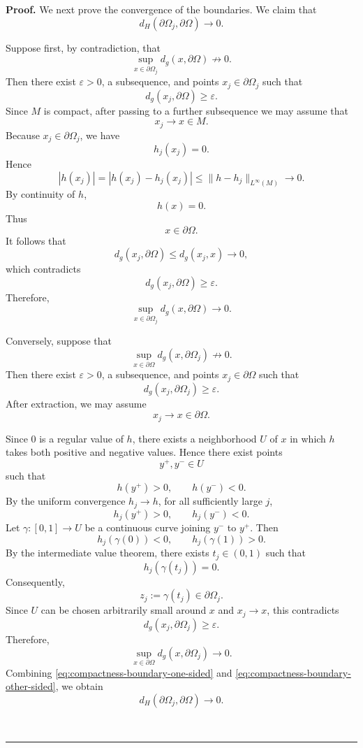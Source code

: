 \documentclass{article}
\newenvironment{proof}[1][Proof]{\textbf{#1.} }{\ \rule{0.5em}{0.5em}}
\begin{document}
\begin{proof}
We next prove the convergence of the boundaries. We claim that
\begin{equation}
d_H(\partial\Omega_j,\partial\Omega)
\longrightarrow0.
\label{eq:compactness-boundary-Hausdorff}
\end{equation}

Suppose first, by contradiction, that
\[
\sup_{x\in\partial\Omega_j}
d_g(x,\partial\Omega)
\not\longrightarrow0.
\]
Then there exist $\varepsilon>0$, a subsequence, and points
$x_j\in\partial\Omega_j$ such that
\[
d_g(x_j,\partial\Omega)\ge\varepsilon.
\]
Since $M$ is compact, after passing to a further subsequence we may
assume that
\[
x_j\longrightarrow x\in M.
\]
Because $x_j\in\partial\Omega_j$, we have
\[
h_j(x_j)=0.
\]
Hence
\[
|h(x_j)|
=
|h(x_j)-h_j(x_j)|
\le
\|h-h_j\|_{L^\infty(M)}
\longrightarrow0.
\]
By continuity of $h$,
\[
h(x)=0.
\]
Thus
\[
x\in\partial\Omega.
\]
It follows that
\[
d_g(x_j,\partial\Omega)
\le d_g(x_j,x)
\longrightarrow0,
\]
which contradicts
\[
d_g(x_j,\partial\Omega)\ge\varepsilon.
\]
Therefore,
\begin{equation}
\sup_{x\in\partial\Omega_j}
d_g(x,\partial\Omega)
\longrightarrow0.
\label{eq:compactness-boundary-one-sided}
\end{equation}

Conversely, suppose that
\[
\sup_{x\in\partial\Omega}
d_g(x,\partial\Omega_j)
\not\longrightarrow0.
\]
Then there exist $\varepsilon>0$, a subsequence, and points
$x_j\in\partial\Omega$ such that
\[
d_g(x_j,\partial\Omega_j)\ge\varepsilon.
\]
After extraction, we may assume
\[
x_j\longrightarrow x\in\partial\Omega.
\]

Since $0$ is a regular value of $h$, there exists a neighborhood $U$
of $x$ in which $h$ takes both positive and negative values. Hence
there exist points
\[
y^+,y^-\in U
\]
such that
\[
h(y^+)>0,
\qquad
h(y^-)<0.
\]
By the uniform convergence $h_j\to h$, for all sufficiently large $j$,
\[
h_j(y^+)>0,
\qquad
h_j(y^-)<0.
\]
Let $\gamma:[0,1]\to U$ be a continuous curve joining $y^-$ to
$y^+$. Then
\[
h_j(\gamma(0))<0,
\qquad
h_j(\gamma(1))>0.
\]
By the intermediate value theorem, there exists
$t_j\in(0,1)$ such that
\[
h_j(\gamma(t_j))=0.
\]
Consequently,
\[
z_j:=\gamma(t_j)\in\partial\Omega_j.
\]
Since $U$ can be chosen arbitrarily small around $x$ and
$x_j\to x$, this contradicts
\[
d_g(x_j,\partial\Omega_j)\ge\varepsilon.
\]
Therefore,
\begin{equation}
\sup_{x\in\partial\Omega}
d_g(x,\partial\Omega_j)
\longrightarrow0.
\label{eq:compactness-boundary-other-sided}
\end{equation}
Combining \eqref{eq:compactness-boundary-one-sided} and
\eqref{eq:compactness-boundary-other-sided}, we obtain
\[
d_H(\partial\Omega_j,\partial\Omega)\longrightarrow0.
\]


\end{proof}
\end{document}
